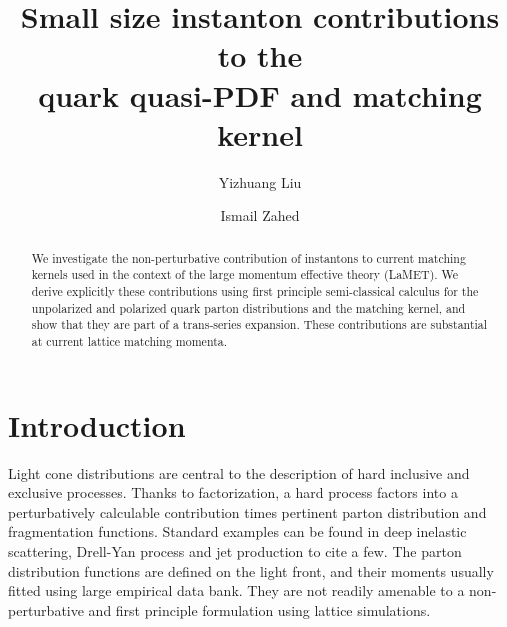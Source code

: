 \documentclass[11pt,aps,amsmath,amssymb,nofootinbib,notitlepage,longbibliography]{revtex4-1}
\begin{document}
\title{
Small size instanton contributions to the\\
quark quasi-PDF and matching kernel}


\author{Yizhuang Liu}



\author{Ismail Zahed}









\begin{abstract}
We investigate the non-perturbative contribution of instantons  to current matching kernels
used in the context of the large momentum effective theory (LaMET). We derive explicitly these contributions
using first principle semi-classical calculus for the unpolarized and polarized quark parton distributions and the matching kernel,
and show that they are part of a trans-series expansion. These contributions  are substantial  at current lattice matching momenta.
\end{abstract}

\maketitle

\section{Introduction}


Light cone distributions are central to the description of hard inclusive and exclusive processes. Thanks to factorization,
a hard process factors  into a perturbatively calculable contribution times pertinent parton distribution and fragmentation
functions. Standard examples can be found in deep inelastic scattering, Drell-Yan process and jet production to cite a few.
The parton distribution functions are defined on the light front, and their moments usually fitted using large empirical data bank.  They
are not readily amenable  to a non-perturbative and first principle formulation using lattice simulations.
\end{document}
